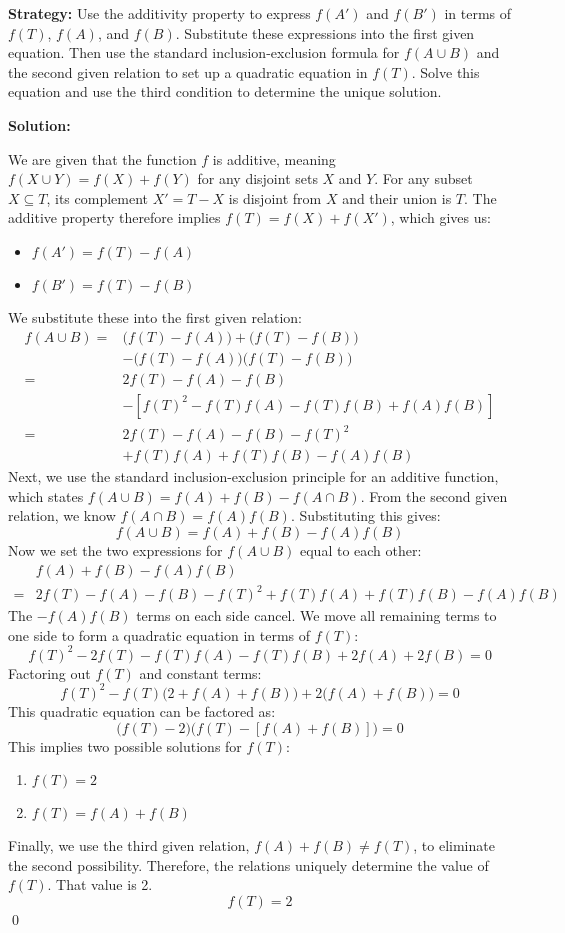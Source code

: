 \noindent\textbf{Strategy:} Use the additivity property to express $f(A')$ and $f(B')$ in terms of $f(T)$, $f(A)$, and $f(B)$. Substitute these expressions into the first given equation. Then use the standard inclusion-exclusion formula for $f(A \cup B)$ and the second given relation to set up a quadratic equation in $f(T)$. Solve this equation and use the third condition to determine the unique solution.

\bigskip\noindent\textbf{Solution:}

We are given that the function \(f\) is additive, meaning \(f(X \cup Y) = f(X) + f(Y)\) for any disjoint sets \(X\) and \(Y\). For any subset \(X \subseteq T\), its complement \(X' = T - X\) is disjoint from \(X\) and their union is \(T\). The additive property therefore implies \(f(T) = f(X) + f(X')\), which gives us:
\begin{itemize}
\item \(f(A') = f(T) - f(A)\)
\item \(f(B') = f(T) - f(B)\)
\end{itemize}
We substitute these into the first given relation:
\begin{align*}
f(A \cup B) =& \big(f(T) - f(A)\big) + \big(f(T) - f(B)\big) \\
&- \big(f(T) - f(A)\big)\big(f(T) - f(B)\big) \\
=& 2f(T) - f(A) - f(B)  \\
&- \left[ f(T)^2 - f(T)f(A) - f(T)f(B) + f(A)f(B) \right] \\
=& 2f(T) - f(A) - f(B) - f(T)^2 \\
&+ f(T)f(A) + f(T)f(B) - f(A)f(B)
\end{align*}
Next, we use the standard inclusion-exclusion principle for an additive function, which states \(f(A \cup B) = f(A) + f(B) - f(A \cap B)\). From the second given relation, we know \(f(A \cap B) = f(A)f(B)\). Substituting this gives:
\[
f(A \cup B) = f(A) + f(B) - f(A)f(B)
\]
Now we set the two expressions for \(f(A \cup B)\) equal to each other:
\begin{align*}
&f(A) + f(B) - f(A)f(B) \\
=& 2f(T) - f(A) - f(B) - f(T)^2 + f(T)f(A) + f(T)f(B) - f(A)f(B)
\end{align*}
The \( -f(A)f(B) \) terms on each side cancel. We move all remaining terms to one side to form a quadratic equation in terms of \(f(T)\):
\[
f(T)^2 - 2f(T) - f(T)f(A) - f(T)f(B) + 2f(A) + 2f(B) = 0
\]
Factoring out \(f(T)\) and constant terms:
\[
f(T)^2 - f(T)\big(2 + f(A) + f(B)\big) + 2\big(f(A) + f(B)\big) = 0
\]
This quadratic equation can be factored as:
\[
\big(f(T) - 2\big) \big(f(T) - [f(A) + f(B)]\big) = 0
\]
This implies two possible solutions for \(f(T)\):
\begin{enumerate}
\item \(f(T) = 2\)
\item \(f(T) = f(A) + f(B)\)
\end{enumerate}
Finally, we use the third given relation, \(f(A) + f(B) \ne f(T)\), to eliminate the second possibility.
Therefore, the relations uniquely determine the value of \(f(T)\). That value is 2.
\[
\boxed{f(T) = 2}
\]\qed

